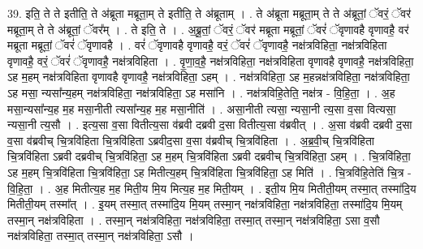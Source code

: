 \documentclass[17pt]{extarticle}
\begin{document}
39. इति॒ ते ते इतीति॒ ते अ॑ब्रूता मब्रूता॒म् ते इतीति॒ ते अ॑ब्रूताम् । . ते अ॑ब्रूता मब्रूता॒म् ते ते अ॑ब्रूतां॒ ॅवरं॒ ॅवर॑ मब्रूता॒म् ते ते अ॑ब्रूतां॒ ॅवर᳚म् । . ते इति॒ ते । . अ॒ब्रू॒तां॒ ॅवरं॒ ॅवर॑ मब्रूता मब्रूतां॒ ॅवरं॑ ॅवृणावहै वृणावहै॒ वर॑ मब्रूता मब्रूतां॒ ॅवरं॑ ॅवृणावहै । . वरं॑ ॅवृणावहै वृणावहै॒ वरं॒ ॅवरं॑ ॅवृणावहै॒ नक्ष॑त्रविहिता॒ नक्ष॑त्रविहिता वृणावहै॒ वरं॒ ॅवरं॑ ॅवृणावहै॒ नक्ष॑त्रविहिता । . वृ॒णा॒व॒है॒ नक्ष॑त्रविहिता॒ नक्ष॑त्रविहिता वृणावहै वृणावहै॒ नक्ष॑त्रविहिता॒ ऽह म॒हम् नक्ष॑त्रविहिता वृणावहै वृणावहै॒ नक्ष॑त्रविहिता॒ ऽहम् । . नक्ष॑त्रविहिता॒ ऽह म॒हन्नक्ष॑त्रविहिता॒ नक्ष॑त्रविहिता॒ ऽह मसा॒ न्यसा᳚न्य॒हम् नक्ष॑त्रविहिता॒ नक्ष॑त्रविहिता॒ ऽह मसा॑नि । . नक्ष॑त्रविहि॒तेति॒ नक्ष॑त्र - वि॒हि॒ता॒ । . अ॒ह मसा॒न्यसा᳚न्य॒ह म॒ह मसा॒नीती त्यसा᳚न्य॒ह म॒ह मसा॒नीति॑ । . असा॒नीती त्यसा॒ न्यसा॒नी त्य॒सा व॒सा वित्यसा॒ न्यसा॒नी त्य॒सौ । . इत्य॒सा व॒सा वितीत्य॒सा व॑ब्रवी दब्रवी द॒सा वितीत्य॒सा व॑ब्रवीत् । . अ॒सा व॑ब्रवी दब्रवी द॒सा व॒सा व॑ब्रवीच् चि॒त्रवि॑हिता चि॒त्रवि॑हिता ऽब्रवीद॒सा व॒सा व॑ब्रवीच् चि॒त्रवि॑हिता । . अ॒ब्र॒वी॒च् चि॒त्रवि॑हिता चि॒त्रवि॑हिता ऽब्रवी दब्रवीच् चि॒त्रवि॑हिता॒ ऽह म॒हम् चि॒त्रवि॑हिता ऽब्रवी दब्रवीच् चि॒त्रवि॑हिता॒ ऽहम् । . चि॒त्रवि॑हिता॒ ऽह म॒हम् चि॒त्रवि॑हिता चि॒त्रवि॑हिता॒ ऽह मितीत्य॒हम् चि॒त्रवि॑हिता चि॒त्रवि॑हिता॒ ऽह मिति॑ । . चि॒त्रवि॑हि॒तेति॑ चि॒त्र - वि॒हि॒ता॒ । . अ॒ह मितीत्य॒ह म॒ह मिती॒य मि॒य मित्य॒ह म॒ह मिती॒यम् । . इती॒य मि॒य मितीती॒यम् तस्मा॒त् तस्मा॑दि॒य मितीती॒यम् तस्मा᳚त् । . इ॒यम् तस्मा॒त् तस्मा॑दि॒य मि॒यम् तस्मा॒न् नक्ष॑त्रविहिता॒ नक्ष॑त्रविहिता॒ तस्मा॑दि॒य मि॒यम् तस्मा॒न् नक्ष॑त्रविहिता । . तस्मा॒न् नक्ष॑त्रविहिता॒ नक्ष॑त्रविहिता॒ तस्मा॒त् तस्मा॒न् नक्ष॑त्रविहिता॒ ऽसा व॒सौ नक्ष॑त्रविहिता॒ तस्मा॒त् तस्मा॒न् नक्ष॑त्रविहिता॒ ऽसौ । \newline
\end{document}
